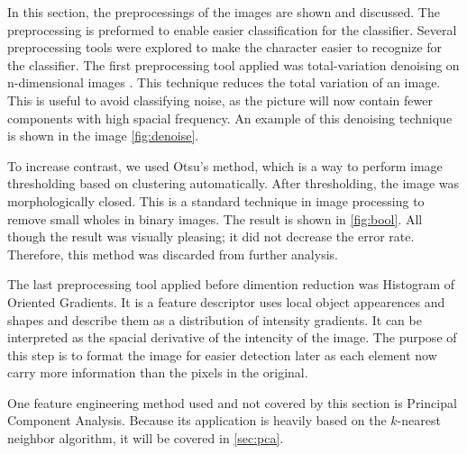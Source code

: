 \documentclass[../main.tex]{subfiles}
\begin{document}
In this section, the preprocessings of the images are shown and discussed. The preprocessing is preformed to enable easier classification for the classifier. Several preprocessing tools were explored to make the character easier to recognize for the classifier. The first preprocessing tool applied was total-variation denoising on n-dimensional images \cite{dnoise_tv_chambolle}. This technique reduces the total variation of an image. This is useful to avoid classifying noise, as the picture will now contain fewer components with high spacial frequency. An example of this denoising technique is shown in the image \autoref{fig:denoise}.

To increase contrast, we used Otsu's method, which is a way to perform image thresholding based on clustering \cite{otsu} automatically. After thresholding, the image was morphologically closed. This is a standard technique in image processing to remove small wholes in binary images. The result is shown in \autoref{fig:bool}. All though the result was visually pleasing; it did not decrease the error rate. Therefore, this method was discarded from further analysis.

The last preprocessing tool applied before dimention reduction was Histogram of Oriented Gradients. It is a feature descriptor uses local object appearences and shapes and describe them as a distribution of intensity gradients. It can be interpreted as the spacial derivative of the intencity of the image. The purpose of this step is to format the image for easier detection later as each element now carry more information than the pixels in the original.

One feature engineering method used and not covered by this section is Principal Component Analysis. Because its application is heavily based on the $k$-nearest neighbor algorithm, it will be covered in \autoref{sec:pca}.
\end{document}
